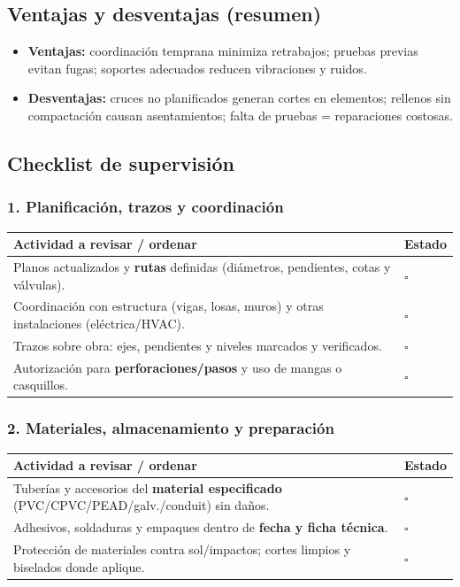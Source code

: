 \documentclass[12pt]{article}
\newcommand{\cbox}{\(\square\)}
\renewcommand{\cbox}{\(\square\)} %
\begin{document}
	\subsection*{Ventajas y desventajas (resumen)}
	\begin{itemize}[leftmargin=*, itemsep=2pt]
		\item \textbf{Ventajas:} coordinación temprana minimiza retrabajos; pruebas previas evitan fugas; soportes adecuados reducen vibraciones y ruidos.
		\item \textbf{Desventajas:} cruces no planificados generan cortes en elementos; rellenos sin compactación causan asentamientos; falta de pruebas = reparaciones costosas.
	\end{itemize}
	
	\subsection{Checklist de supervisión}
	
	\subsubsection*{1. Planificación, trazos y coordinación}
	\begin{tabularx}{\linewidth}{>{\raggedright\arraybackslash}p{0.93\linewidth} >{\centering\arraybackslash}m{0.07\linewidth}}
		\toprule
		\textbf{Actividad a revisar / ordenar} & \textbf{Estado}\\
		\midrule
		Planos actualizados y \textbf{rutas} definidas (diámetros, pendientes, cotas y válvulas). & \cbox \\
		Coordinación con estructura (vigas, losas, muros) y otras instalaciones (eléctrica/HVAC). & \cbox \\
		Trazos sobre obra: ejes, pendientes y niveles marcados y verificados. & \cbox \\
		Autorización para \textbf{perforaciones/pasos} y uso de mangas o casquillos. & \cbox \\
		\bottomrule
	\end{tabularx}
	
	\subsubsection*{2. Materiales, almacenamiento y preparación}
	\begin{tabularx}{\linewidth}{>{\raggedright\arraybackslash}p{0.93\linewidth} >{\centering\arraybackslash}m{0.07\linewidth}}
		\toprule
		\textbf{Actividad a revisar / ordenar} & \textbf{Estado}\\
		\midrule
		Tuberías y accesorios del \textbf{material especificado} (PVC/CPVC/PEAD/galv./conduit) sin daños. & \cbox \\
		Adhesivos, soldaduras y empaques dentro de \textbf{fecha y ficha técnica}. & \cbox \\
		Protección de materiales contra sol/impactos; cortes limpios y biselados donde aplique. & \cbox \\
		\bottomrule
	\end{tabularx}
	
\end{document}
